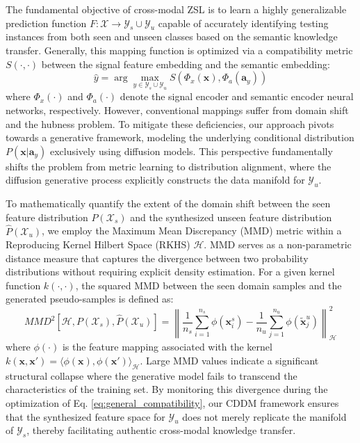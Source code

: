 The fundamental objective of cross-modal ZSL is to learn a highly generalizable prediction function $F: \mathcal{X} \rightarrow \mathcal{Y}_s \cup \mathcal{Y}_u$ capable of accurately identifying testing instances from both seen and unseen classes based on the semantic knowledge transfer. Generally, this mapping function is optimized via a compatibility metric $S(\cdot, \cdot)$ between the signal feature embedding and the semantic embedding:
\begin{equation}\label{eq:general_compatibility}
\hat{y} = \arg\max_{y \in \mathcal{Y}_s \cup \mathcal{Y}_u} S\left( \Phi_x(\mathbf{x}), \Phi_a(\mathbf{a}_y) \right)
\end{equation}
where $\Phi_x(\cdot)$ and $\Phi_a(\cdot)$ denote the signal encoder and semantic encoder neural networks, respectively. However, conventional mappings suffer from domain shift and the hubness problem. To mitigate these deficiencies, our approach pivots towards a generative framework, modeling the underlying conditional distribution $P(\mathbf{x}|\mathbf{a}_y)$ exclusively using diffusion models. This perspective fundamentally shifts the problem from metric learning to distribution alignment, where the diffusion generative process explicitly constructs the data manifold for $\mathcal{Y}_u$.

To mathematically quantify the extent of the domain shift between the seen feature distribution $P(\mathcal{X}_s)$ and the synthesized unseen feature distribution $\hat{P}(\mathcal{X}_u)$, we employ the Maximum Mean Discrepancy (MMD) metric within a Reproducing Kernel Hilbert Space (RKHS) $\mathcal{H}$. MMD serves as a non-parametric distance measure that captures the divergence between two probability distributions without requiring explicit density estimation. For a given kernel function $k(\cdot, \cdot)$, the squared MMD between the seen domain samples and the generated pseudo-samples is defined as:
\begin{equation}\label{eq:mmd_formulation}
MMD^2[\mathcal{H}, P(\mathcal{X}_s), \hat{P}(\mathcal{X}_u)] = \left\| \frac{1}{n_s} \sum_{i=1}^{n_s} \phi(\mathbf{x}_i^s) - \frac{1}{n_u} \sum_{j=1}^{n_u} \phi(\tilde{\mathbf{x}}_j^u) \right\|_{\mathcal{H}}^2
\end{equation}
where $\phi(\cdot)$ is the feature mapping associated with the kernel $k(\mathbf{x}, \mathbf{x}') = \langle \phi(\mathbf{x}), \phi(\mathbf{x}') \rangle_{\mathcal{H}}$. Large MMD values indicate a significant structural collapse where the generative model fails to transcend the characteristics of the training set. By monitoring this divergence during the optimization of Eq. \ref{eq:general_compatibility}, our CDDM framework ensures that the synthesized feature space for $\mathcal{Y}_u$ does not merely replicate the manifold of $\mathcal{Y}_s$, thereby facilitating authentic cross-modal knowledge transfer.

